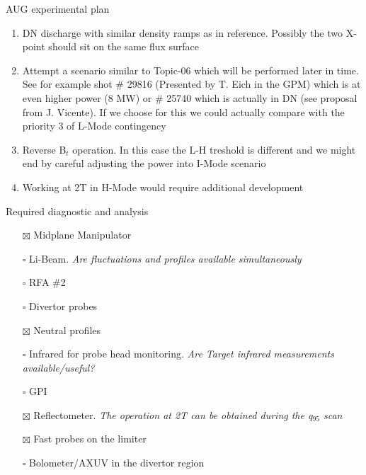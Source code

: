 \documentclass[10pt, compress]{beamer}
\begin{document}
\begin{frame}{AUG experimental plan}
{\begin{enumerate}
{   transport}
    \item \textcolor{ta3chameleon}{DN discharge with similar density ramps as in reference. Possibly the two X-point should
   sit on the same flux surface}
   \item \textcolor{ta3scarletred}{Attempt a scenario similar to Topic-06 which will be performed later in time. See for example
   shot \# 29816 (Presented by T. Eich in the GPM) which is at even
   higher power (8 MW) or \# 25740
   which is actually in DN (see proposal from J. Vicente). If we choose for this we could actually compare with the priority 3 of L-Mode
   contingency}
 \item \textcolor{ta3scarletred}{Reverse B$_{t}$ operation. In this case the L-H treshold is different and we might end
     by careful adjusting the power into I-Mode scenario}
   \item \textcolor{ta3skyblue}{Working at 2T in H-Mode would require
       additional development}
\end{enumerate}
  }
\end{frame}
\begin{frame}{Required diagnostic and analysis}
  \begin{itemize}
    \item[$\boxtimes$] Midplane Manipulator
    \item[$\square$] Li-Beam. \emph{Are fluctuations and profiles
        available simultaneously}
    \item[$\square$] RFA \#2
    \item[$\square$] Divertor probes
    \item[$\boxtimes$] Neutral profiles
    \item[$\square$] Infrared for probe head monitoring. \emph{Are Target
      infrared measurements available/useful?}
    \item[$\square$] GPI
    \item[$\boxtimes$] Reflectometer. \emph{The operation at 2T can be
      obtained during the q$_{95}$ scan}
    \item[$\boxtimes$] Fast probes on the limiter
    \item[$\square$] Bolometer/AXUV in the divertor region
  \end{itemize}
\end{frame}
\end{document}
